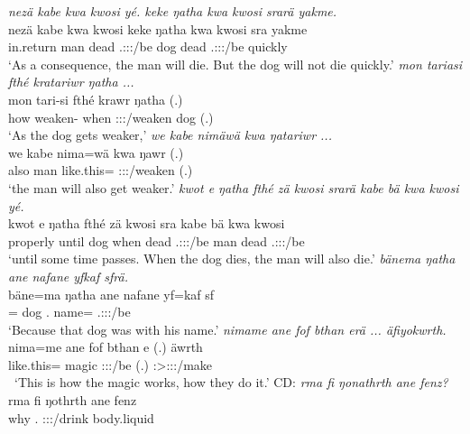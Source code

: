 \begin{exe}
	\emph{nezä kabe kwa kwosi yé. keke ŋatha kwa kwosi srarä yakme.}\\
	\gll nezä kabe kwa kwosi  keke ŋatha kwa kwosi sra yakme\\
	in.return man {\Fut} dead \Tsg.\Masc:\Sbj:\Nonpast:\Ipfv/be {\Neg} dog {\Fut} dead \Tsg.\Masc:\Sbj:\Irr:\Ipfv/be quickly\\
	\trans `As a consequence, the man will die. But the dog will not die quickly.'
	\emph{mon tariasi fthé kratariwr ŋatha ...}\\
	\gll mon tari-si fthé krawr ŋatha (.)\\
	how weaken-{\Nmlz} when \Stsg:\Sbj:\Irr:\Ipfv/weaken dog (.)\\
	\trans `As the dog gets weaker,'
	\emph{we kabe nimäwä kwa ŋatariwr ...}\\
	\gll we kabe nima=wä kwa ŋawr (.)\\
	also man like.this={\Emph} {\Fut} \Stsg:\Sbj:\Nonpast:\Ipfv/weaken (.)\\
	\trans `the man will also get weaker.'
	\emph{kwot e ŋatha fthé zä kwosi srarä kabe bä kwa kwosi yé.}\\
	\gll kwot e ŋatha fthé zä kwosi sra kabe bä kwa kwosi \\
	properly until dog when {\Prox} dead \Tsg.\Masc:\Sbj:\Irr:\Ipfv/be man \Med{} {\Fut} dead \Tsg.\Masc:\Sbj:\Nonpast:\Ipfv/be\\
	\trans `until some time passes. When the dog dies, the man will also die.'
	\emph{bänema ŋatha ane nafane yfkaf sfrä.}\\
	\gll bäne=ma ŋatha ane nafane yf=kaf sf\\
	\Recog={\Char} dog {\Dem} \Tsg.{\Poss} name={\Prop} \Tsg.\Masc:\Sbj:\Rpst:\Ipfv/be\\
	\trans `Because that dog was with his name.'
	\emph{nimame ane fof bthan erä ... äfiyokwrth.}\\
	\gll nima=me ane fof bthan e (.) äwrth\\
	like.this={\Ins} {\Dem} {\Emph} magic \Stpl:\Sbj:\Nonpast:\Ipfv/be (.) \Stpl:\Sbj>\Stpl:\Obj:\Nonpast:\Ipfv/make\\\
	\trans `This is how the magic works, how they do it.'
	\textsc{CD}: \emph{rma fi ŋonathrth ane fenz?}\\
	\gll rma fi ŋothrth ane fenz\\
	why \Third.{\Abs} \Stpl:\Sbj:\Nonpast:\Ipfv/drink {\Dem} body.liquid\\

\end{exe}
